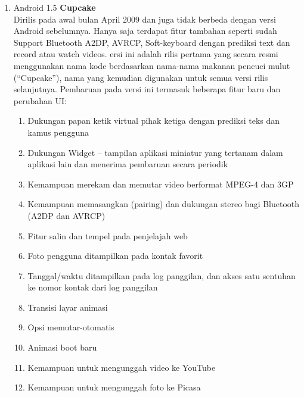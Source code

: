 \begin{enumerate}
\item Android 1.5 \textbf{Cupcake}\\
Dirilis pada awal bulan April 2009 dan juga tidak berbeda dengan versi Android sebelumnya. Hanya saja terdapat fitur tambahan seperti sudah Support Bluetooth A2DP, AVRCP, Soft-keyboard dengan prediksi text dan record atau watch videos. ersi ini adalah rilis pertama yang secara resmi menggunakan nama kode berdasarkan nama-nama makanan pencuci mulut (“Cupcake”), nama yang kemudian digunakan untuk semua versi rilis selanjutnya. Pembaruan pada versi ini termasuk beberapa fitur baru dan perubahan UI:
\begin{enumerate}
    \item Dukungan papan ketik virtual pihak ketiga dengan prediksi teks dan kamus pengguna
    \item Dukungan Widget – tampilan aplikasi miniatur yang tertanam dalam aplikasi lain dan menerima pembaruan secara periodik
    \item Kemampuan merekam dan memutar video berformat MPEG-4 dan 3GP
    \item Kemampuan memasangkan (pairing) dan dukungan stereo bagi Bluetooth (A2DP dan AVRCP)
    \item Fitur salin dan tempel pada penjelajah web
    \item Foto pengguna ditampilkan pada kontak favorit
    \item Tanggal/waktu ditampilkan pada log panggilan, dan akses satu sentuhan ke nomor kontak dari log panggilan
    \item Transisi layar animasi
    \item Opsi memutar-otomatis
    \item Animasi boot baru
    \item Kemampuan untuk mengunggah video ke YouTube
    \item Kemampuan untuk mengunggah foto ke Picasa
\end{enumerate}



\end{enumerate}
